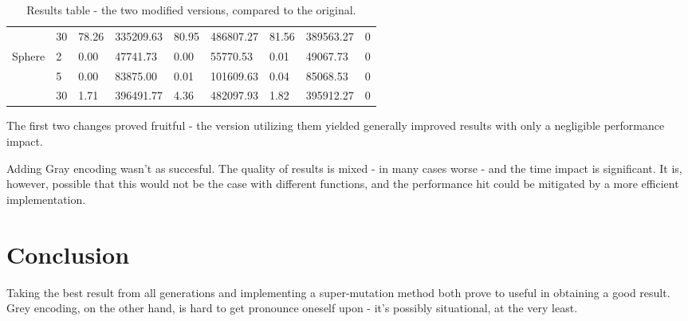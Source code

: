 \documentclass{article}
\begin{document}
\begin{table}[!h]
{\begin{tabular}{ll|lllllll}
                                    & 30                 & 78.26            & 335209.63          & 80.95            & 486807.27         & 81.56           & 389563.27         & 0                       \\
    \multirow{3}{*}{Sphere}         & 2                  & 0.00             & 47741.73           & 0.00             & 55770.53          & 0.01            & 49067.73          & 0                       \\
                                    & 5                  & 0.00             & 83875.00           & 0.01             & 101609.63         & 0.04            & 85068.53          & 0                       \\
                                    & 30                 & 1.71             & 396491.77          & 4.36             & 482097.93         & 1.82            & 395912.27         & 0                      
    \end{tabular}
    }
    \caption{Results table - the two modified versions, compared to the original.}
    \end{table}

    The first two changes proved fruitful - the version utilizing them yielded generally improved results with only a negligible performance impact.

    Adding Gray encoding wasn't as succesful. The quality of results is mixed - in many cases worse - and the time impact is significant. It is, however, possible that this would not be the case with different functions, and the performance hit could be mitigated by a more efficient implementation.

    \section{Conclusion}
    Taking the best result from all generations and implementing a super-mutation method both prove to useful in obtaining a good result. Grey encoding, on the other hand, is hard to get pronounce oneself upon - it's possibly situational, at the very least.
\end{document}

